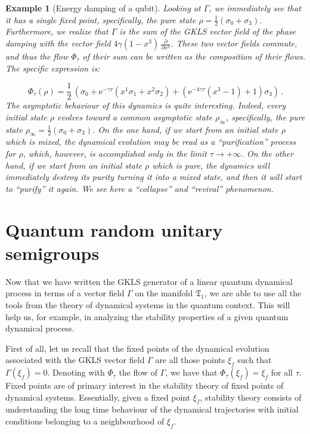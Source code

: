 \documentclass[11pt]{article}
\newcommand{\be}{\begin{equation}}
\newcommand{\ee}{\end{equation}}
\newtheorem{exmp}{Example}
\begin{document}
\begin{exmp}[Energy damping of a qubit]
Looking at $\Gamma$, we immediately see that it has a single fixed point, specifically, the pure state $\rho=\frac{1}{2}(\sigma_{0} + \sigma_{3})$.
Furthermore, we realize that $\Gamma$ is the sum of the GKLS vector field of the phase damping with the vector field $4\gamma\left(1 - x^{3}\right)\,\frac{\partial}{\partial x^{3}}$.
These two vector fields commute, and thus the flow $\Phi_{\tau}$ of their sum can be written as the composition of their flows.
The specific expression is:

\be
\Phi_{\tau}(\rho)=\frac{1}{2}\,\left(\sigma_{0} + \mathrm{e}^{-\gamma\tau}\left(x^{1}\sigma_{1} + x^{2}\sigma_{2}\right) + \left(\mathrm{e}^{-4\gamma\tau}\left( x^{3} - 1\right) + 1\right)\sigma_{3}\right)\,.
\ee
The asymptotic behaviour of this dynamics is quite interesting.
Indeed, every initial state $\rho$ evolves toward a common asymptotic state $\rho_{\infty}$, specifically, the pure state $\rho_{\infty}=\frac{1}{2}(\sigma_{0} + \sigma_{3})$.
On the one hand, if we start from an initial state $\rho$ which is mixed, the dynamical evolution may be read as a ``purification'' process for $\rho$, which, however, is accomplished only in the limit $\tau\rightarrow + \infty$.
On the other hand, if we start from an initial state $\rho$ which is pure, the dynamics will immediately destroy its purity turning it into a mixed state, and then it will start to ``purify'' it again.
We see here a ``collapse'' and ``revival'' phenomenon.
\end{exmp}



\section{Quantum random unitary semigroups}\label{sec: Quantum Poisson semigroups}



Now that we have written the GKLS generator of a linear quantum dynamical process in terms of a vector field $\Gamma$ on the manifold $\mathfrak{T}_{1}$, we are able to use all the tools from the theory of dynamical systems in the quantum context.
This will help us, for example, in analyzing the stability properties of a given quantum dynamical process.

First of all, let us recall that the fixed points of the dynamical evolution associated with the GKLS vector field $\Gamma$ are all those points $\xi_{f}$ such that $\Gamma(\xi_{f})=0$.
Denoting with $\Phi_{\tau}$ the flow of $\Gamma$, we have that $\Phi_{\tau}(\xi_{f})=\xi_{f}$ for all $\tau$.
Fixed points are of primary interest in the stability theory of fixed points of dynamical systems.
Essentially, given a fixed point $\xi_{f}$, stability theory consists of understanding the long time behaviour of the dynamical trajectories with initial conditions belonging to a neighbourhood of $\xi_{f}$.
\end{document}
